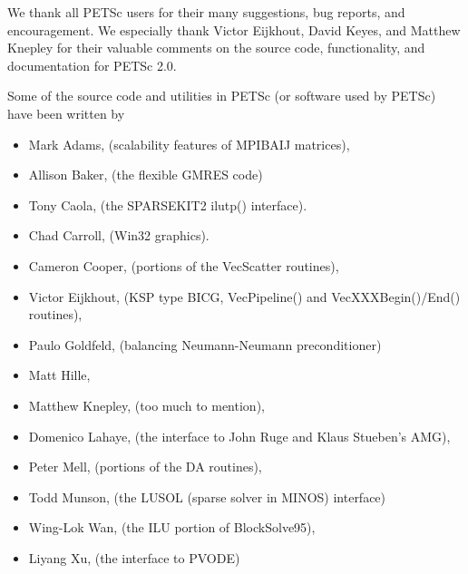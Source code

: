 %
%

\medskip \medskip \noindent
We thank all PETSc users for their many suggestions, bug reports, and
encouragement.  We especially thank Victor Eijkhout, David Keyes, and
Matthew Knepley for their valuable comments on the source code,
functionality, and documentation for PETSc 2.0.


\vspace{.3in}
\noindent
Some of the source code and utilities in PETSc (or software used by PETSc)
have been written by 
\begin{itemize}
  \item Mark Adams, (scalability features of MPIBAIJ matrices),
  \item Allison Baker, (the flexible GMRES code)
  \item Tony Caola, (the SPARSEKIT2 ilutp() interface).
  \item Chad Carroll, (Win32 graphics).
  \item Cameron Cooper, (portions of the VecScatter routines), 
  \item Victor Eijkhout, (KSP type BICG, VecPipeline() and VecXXXBegin()/End() routines), 
  \item Paulo Goldfeld, (balancing Neumann-Neumann preconditioner)
  \item Matt Hille, 
  \item Matthew Knepley, (too much to mention),
  \item Domenico Lahaye, (the interface to John Ruge and Klaus Stueben's AMG),
  \item Peter Mell, (portions of the DA routines),
  \item Todd Munson, (the LUSOL (sparse solver in MINOS) interface)
  \item Wing-Lok Wan, (the ILU portion of BlockSolve95),
  \item Liyang Xu, (the interface to PVODE)
\end{itemize}

